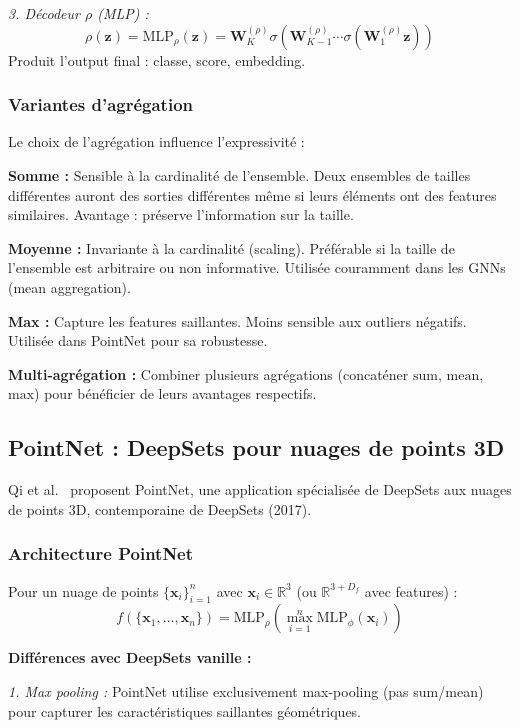 \textit{3. Décodeur $\rho$ (MLP) :}
\[
\rho(\mathbf{z}) = \text{MLP}_\rho(\mathbf{z}) = \mathbf{W}_K^{(\rho)} \sigma(\mathbf{W}_{K-1}^{(\rho)} \cdots \sigma(\mathbf{W}_1^{(\rho)} \mathbf{z}))
\]
Produit l'output final : classe, score, embedding.

\subsubsection{Variantes d'agrégation}

Le choix de l'agrégation influence l'expressivité :

\textbf{Somme :}
Sensible à la cardinalité de l'ensemble. Deux ensembles de tailles différentes auront des sorties différentes même si leurs éléments ont des features similaires. Avantage : préserve l'information sur la taille.

\textbf{Moyenne :}
Invariante à la cardinalité (scaling). Préférable si la taille de l'ensemble est arbitraire ou non informative. Utilisée couramment dans les GNNs (mean aggregation).

\textbf{Max :}
Capture les features saillantes. Moins sensible aux outliers négatifs. Utilisée dans PointNet pour sa robustesse.

\textbf{Multi-agrégation :}
Combiner plusieurs agrégations (concaténer $\text{sum}$, $\text{mean}$, $\text{max}$) pour bénéficier de leurs avantages respectifs.

\subsection{PointNet : DeepSets pour nuages de points 3D}

Qi et al.~\cite{Qi2017} proposent PointNet, une application spécialisée de DeepSets aux nuages de points 3D, contemporaine de DeepSets (2017).

\subsubsection{Architecture PointNet}

Pour un nuage de points $\{\mathbf{x}_i\}_{i=1}^n$ avec $\mathbf{x}_i \in \mathbb{R}^3$ (ou $\mathbb{R}^{3+D_f}$ avec features) :
\[
f(\{\mathbf{x}_1, \ldots, \mathbf{x}_n\}) = \text{MLP}_{\rho}\left(\max_{i=1}^n \text{MLP}_{\phi}(\mathbf{x}_i)\right)
\]

\textbf{Différences avec DeepSets vanille :}

\textit{1. Max pooling :}
PointNet utilise exclusivement max-pooling (pas sum/mean) pour capturer les caractéristiques saillantes géométriques.

